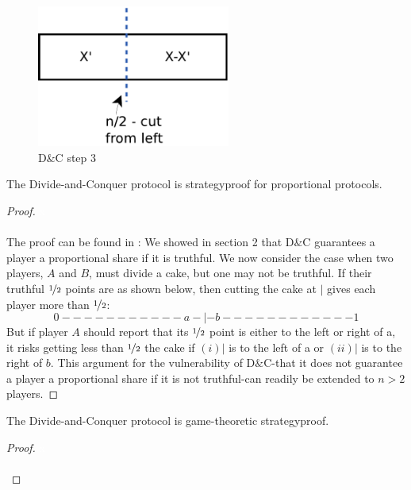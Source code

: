 \begin{figure}[h!]
		\centering
 		 \includegraphics[width=180pt]{bilder/dc1.pdf}
   \caption{D$\&$C step 3}
  	 \end{figure}
\begin{lem}
The Divide-and-Conquer protocol is strategyproof for proportional protocols.
\end{lem}
\begin{proof} 
\textcolor{white}{x}\\\\
The proof can be found in \cite{dc}: We showed in section 2 that D$\&$C guarantees a player a proportional share 
if it is truthful.  We now consider the case when two players, $A$ and $B$, must divide a 
cake, but one may not be truthful.  If their truthful $\nicefrac{1}{2}$ points are as shown below, then 
cutting the cake at $|$ gives each player more than $\nicefrac{1}{2}$: 
$$0-----------a-|-b------------1$$ 
But if player $A$ should report that its $\nicefrac{1}{2}$ point is either to the left or right of a, it risks 
getting less than $\nicefrac{1}{2}$ the cake if $(i) |$ is to the left of a or $(ii) |$ is to the right of $b$.  This argument for the vulnerability of D$\&$C-that it does not guarantee a player a proportional 
share if it is not truthful-can readily be extended to $n > 2$ players.
\end{proof}
\begin{lem}
The Divide-and-Conquer protocol is game-theoretic strategyproof.
\end{lem}
\begin{proof}
\textcolor{white}{x}\\\\
\end{proof}
\newpage
